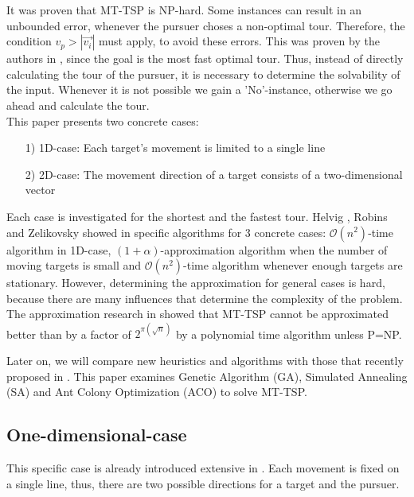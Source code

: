 \documentclass{acm_proc_article-sp}
\begin{document}
It was proven that MT-TSP is NP-hard. Some instances can result in an unbounded error, whenever the pursuer choses a non-optimal tour. Therefore, the condition $v_p > |\overrightarrow{v_i}|$ must apply, to avoid these errors. This was proven by the authors in \cite{helvig}, since the goal is the most fast optimal tour.  Thus, instead of directly calculating the tour of the pursuer, it is necessary to determine the solvability of the input. Whenever it is not possible we gain a 'No'-instance, otherwise we go ahead and calculate the tour. \\
This paper presents two concrete cases:
\begin{itemize}
\item[1)]
1D-case: 
Each target's movement is limited to a single line 

\item[2)]
2D-case:
The movement direction of a target consists of a two-dimensional vector 

\end{itemize}

Each case is investigated for the shortest and the fastest tour. Helvig , Robins and Zelikovsky showed in \cite{helvig} specific algorithms for 3 concrete cases: $\mathcal{O}(n^2)$-time algorithm in 1D-case, $(1+\alpha)$-approximation algorithm when the number of moving targets is small and $\mathcal{O}(n^2)$-time algorithm whenever enough targets are stationary. However, determining the approximation for general cases is hard, because there are many influences that determine the complexity of the problem. The approximation research in \cite{hammar} showed that MT-TSP cannot be approximated better than by a factor of $2^{\pi (\sqrt{n})}$ by a polynomial time algorithm unless P=NP.

Later on, we will compare new heuristics and algorithms with those that recently proposed in \cite{moraes}. This paper examines Genetic Algorithm (GA), Simulated Annealing (SA) and Ant Colony Optimization (ACO) to solve MT-TSP.

\subsection{One-dimensional-case}

This specific case is already introduced extensive in \cite{helvig}. Each movement is fixed on a single line, thus, there are two possible directions for a target and the pursuer. 
\end{document}
